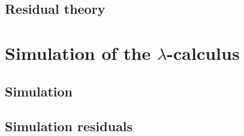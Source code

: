 \section{Residual theory}


\chapter{Simulation of the $\lambda$-calculus}

\section{Simulation}

\section{Simulation residuals}

